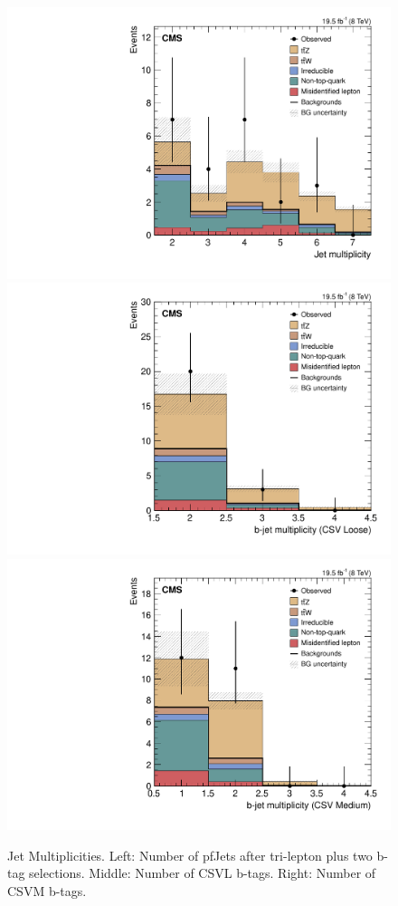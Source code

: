 \begin{figure}[h]
\begin{center}
\includegraphics[width=0.48\linewidth]{Figs/Plots_PreSelections/hNJets_3L2b.pdf}
\includegraphics[width=0.48\linewidth]{Figs/Plots_PreSelections/hNLoose_3L2b.pdf}
\includegraphics[width=0.48\linewidth]{Figs/Plots_PreSelections/hNMedium_3L2b.pdf}
\caption{\label{fig:jetmult_3L2b}
Jet Multiplicities. Left: Number of pfJets after tri-lepton plus two b-tag selections. Middle: Number of CSVL b-tags. Right: Number of CSVM b-tags.
}
\end{center}
\end{figure}

